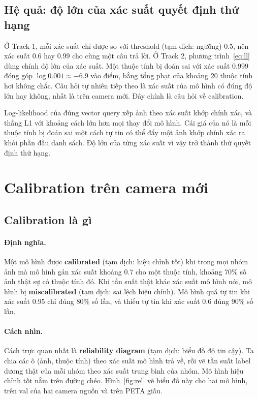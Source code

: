 \documentclass[11pt,a4paper]{article}
\begin{document}
\subsection{Hệ quả: độ lớn của xác suất quyết định thứ hạng}

Ở Track 1, mỗi xác suất chỉ được so với threshold (tạm dịch: ngưỡng) 0.5, nên xác suất 0.6 hay 0.99 cho cùng một câu trả lời. Ở Track 2, phương trình~\eqref{eq:ll} dùng chính độ lớn của xác suất. Một thuộc tính bị đoán sai với xác suất 0.999 đóng góp $\log 0.001\approx-6.9$ vào điểm, bằng tổng phạt của khoảng 20 thuộc tính hơi không chắc. Câu hỏi tự nhiên tiếp theo là xác suất của mô hình có đúng độ lớn hay không, nhất là trên camera mới. Đây chính là câu hỏi về calibration.

\begin{ghichu}
Log-likelihood của đúng vector query xếp ảnh theo xác suất khớp chính xác, và thắng L1 với khoảng cách lớn hơn mọi thay đổi mô hình. Cái giá của nó là mỗi thuộc tính bị đoán sai một cách tự tin có thể đẩy một ảnh khớp chính xác ra khỏi phần đầu danh sách. Độ lớn của từng xác suất vì vậy trở thành thứ quyết định thứ hạng.
\end{ghichu}

\section{Calibration trên camera mới}
\label{sec:calib}

\subsection{Calibration là gì}

\paragraph{Định nghĩa.} Một mô hình được \textbf{calibrated} (tạm dịch: hiệu chỉnh tốt) khi trong mọi nhóm ảnh mà mô hình gán xác suất khoảng 0.7 cho một thuộc tính, khoảng 70\% số ảnh thật sự có thuộc tính đó. Khi tần suất thật khác xác suất mô hình nói, mô hình bị \textbf{miscalibrated} (tạm dịch: sai lệch hiệu chỉnh). Mô hình quá tự tin khi xác suất 0.95 chỉ đúng 80\% số lần, và thiếu tự tin khi xác suất 0.6 đúng 90\% số lần.

\paragraph{Cách nhìn.} Cách trực quan nhất là \textbf{reliability diagram} (tạm dịch: biểu đồ độ tin cậy). Ta chia các ô (ảnh, thuộc tính) theo xác suất mô hình trả về, rồi vẽ tần suất label dương thật của mỗi nhóm theo xác suất trung bình của nhóm. Mô hình hiệu chỉnh tốt nằm trên đường chéo. Hình~\ref{fig:rel} vẽ biểu đồ này cho hai mô hình, trên val của hai camera nguồn và trên PETA giấu.
\end{document}
